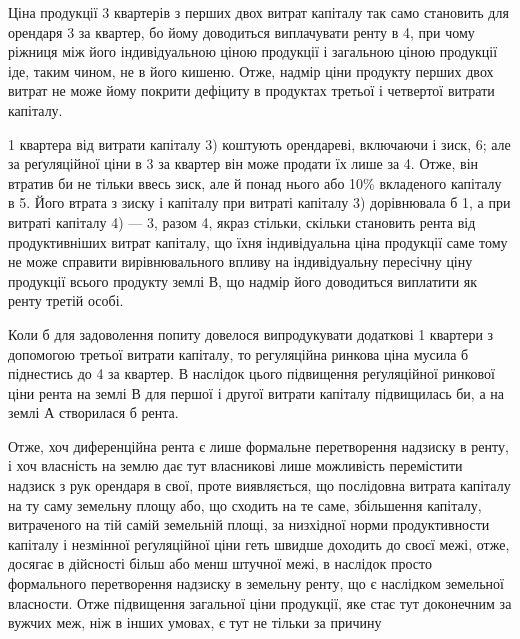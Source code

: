 
Ціна продукції 3 квартерів з перших двох витрат капіталу так само
становить для орендаря 3 за квартер, бо йому доводиться виплачувати
ренту в 4, при чому ріжниця між його індивідуальною ціною продукції
і загальною ціною продукції іде, таким чином, не в його кишеню. Отже,
надмір ціни продукту перших двох витрат не може йому покрити дефіциту
в продуктах третьої і четвертої витрати капіталу.

1 квартера від витрати капіталу 3) коштують орендареві, включаючи
і зиск, 6; але за реґуляційної ціни в 3 за квартер він може
продати їх лише за 4. Отже, він втратив би не тільки ввесь
зиск, але й понад нього  або  10\% вкладеного капіталу в 5.
Його втрата з зиску і капіталу при витраті капіталу 3) дорівнювала б  1, а при витраті капіталу 4) — 3, разом 4, якраз
стільки, скільки становить рента від продуктивніших витрат капіталу, що їхня
індивідуальна ціна продукції саме тому не може справити вирівнювального
впливу на індивідуальну пересічну ціну продукції всього продукту землі $В$, що
надмір його доводиться виплатити як ренту третій особі.

Коли б для задоволення попиту довелося випродукувати додаткові 1
квартери з допомогою третьої витрати капіталу, то регуляційна ринкова ціна
мусила б піднестись до 4 за квартер. В наслідок цього підвищення
реґуляційної ринкової ціни рента на землі $В$ для першої і другої витрати капіталу
підвищилась би, а на землі $А$ створилася б рента.

Отже, хоч диференційна рента є лише формальне перетворення надзиску
в ренту, і хоч власність на землю дає тут власникові лише можливість перемістити
надзиск з рук орендаря в свої, проте виявляється, що послідовна витрата
капіталу на ту саму земельну площу або, що сходить на те саме, збільшення
капіталу, витраченого на тій самій земельній площі, за низхідної норми
продуктивности капіталу і незмінної реґуляційної ціни геть швидше доходить
до своєї межі, отже, досягає в дійсності більш або менш штучної межі, в наслідок
просто формального перетворення надзиску в земельну ренту, що є наслідком
земельної власности. Отже підвищення загальної ціни продукції, яке стає
тут доконечним за вужчих меж, ніж в інших умовах, є тут не тільки за причину
\parbreak{}  %
